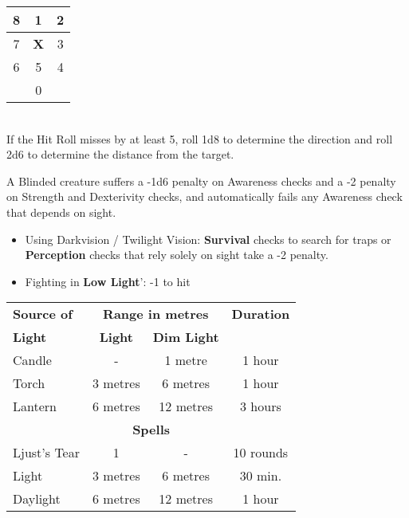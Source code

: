 \documentclass[landscape,10pt,a4paper]{article}
\begin{document}
\begin{multicols}{3}
\begin{dmbox}[title=Scatter Ranged Weapons - page \pageref{attackswithscatterweapons}]
\noindent\begin{tabular}{c|c|c}
8 &1 &2\\
\hline
7 &\textbf{X}& 3\\
\hline
6 &5& 4\\
\hline
&0&\\
\end{tabular}\\

If the Hit Roll misses by at least 5, roll 1d8 to determine the direction and roll 2d6 to determine the distance from the target.
\end{dmbox}

\begin{dmbox}[title=Vision - page \pageref{visionandlight}]

A Blinded creature suffers a -1d6 penalty on Awareness checks and a -2 penalty on Strength and Dexterivity checks, and automatically fails any Awareness check that depends on sight.

\begin{itemize}[leftmargin=0.5cm,itemsep=-1pt,parsep=0pt]
\item Using Darkvision / Twilight Vision: \textbf{Survival} checks to search for traps or \textbf{Perception} checks that rely solely on sight take a -2 penalty.
\item Fighting in \textbf{Low Light}': -1 to hit
\end{itemize}
\end{dmbox}

\begin{dmbox}[title=Light Sources - page \pageref{light sources}]

\noindent\begin{tabular}{l|cc|c}
\textbf{Source of} &\multicolumn{2}{c}{\textbf{Range in metres}}& \textbf{Duration} \\
\textbf{Light}& \textbf{Light} & \textbf{Dim Light} &\\
Candle & - & 1 metre & 1 hour\\
Torch & 3 metres & 6 metres & 1 hour\\
Lantern & 6 metres & 12 metres & 3 hours \\
\multicolumn{4}{c}{\textbf{Spells}}\\
Ljust's Tear & 1 & - & 10 rounds\\
Light & 3 metres & 6 metres &30 min. \\
Daylight & 6 metres & 12 metres & 1 hour 
\end{tabular}
\end{dmbox}


\end{multicols}
\end{document}
